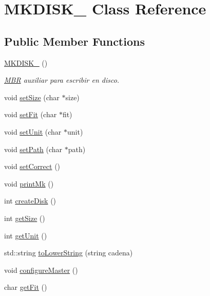 \hypertarget{classMKDISK__}{}\section{M\+K\+D\+I\+S\+K\+\_\+ Class Reference}
\label{classMKDISK__}
\subsection*{Public Member Functions}
\begin{DoxyCompactItemize}
\item 
\hyperlink{classMKDISK___a320ed310d37d0912e1d96000213aed35}{M\+K\+D\+I\+S\+K\+\_\+} ()
\begin{DoxyCompactList}\small\item\em \hyperlink{structMBR}{M\+BR} auxiliar para escribir en disco. \end{DoxyCompactList}\item 
void \hyperlink{classMKDISK___a6fdf50f3e20009c7a84f3311ba1bc70c}{set\+Size} (char $\ast$size)
\item 
void \hyperlink{classMKDISK___a12001e69efc0110fafe2a5190d06a47d}{set\+Fit} (char $\ast$fit)
\item 
void \hyperlink{classMKDISK___a7a7755430182c5668dbbacf102df839d}{set\+Unit} (char $\ast$unit)
\item 
void \hyperlink{classMKDISK___ab46a4029dc7384bf7687c71221139a38}{set\+Path} (char $\ast$path)
\item 
void \hyperlink{classMKDISK___a9bcda3d3c6b9e0b6e42ff23538993378}{set\+Correct} ()
\item 
void \hyperlink{classMKDISK___a0589ffca3e13a4175510e2c6a60f2108}{print\+Mk} ()
\item 
int \hyperlink{classMKDISK___a6e61f79331a9d7d64f90791ec4f071c2}{create\+Disk} ()
\item 
int \hyperlink{classMKDISK___a2e73ce9adcd4ff071099420917d4585a}{get\+Size} ()
\item 
int \hyperlink{classMKDISK___a1dd09004e54bd40d98db5edcd7c62f61}{get\+Unit} ()
\item 
std\+::string \hyperlink{classMKDISK___a79ea3d7a98d06a929418dad2cd380523}{to\+Lower\+String} (string cadena)
\item 
void \hyperlink{classMKDISK___a7eee0fd7b056178946930a5e6bedf643}{configure\+Master} ()
\item 
char \hyperlink{classMKDISK___a7f632d7a17f80e97a0e4050c29ae95cd}{get\+Fit} ()
\end{DoxyCompactItemize}



